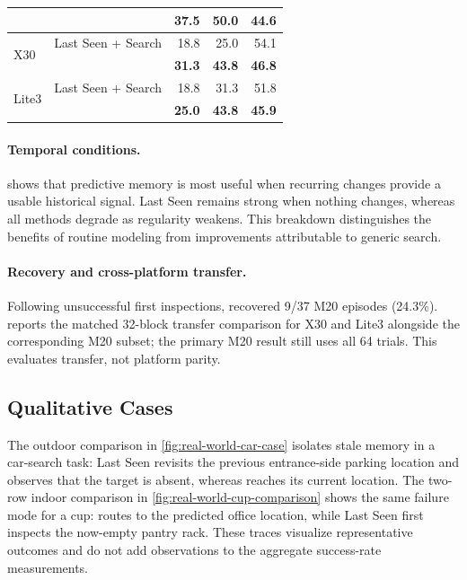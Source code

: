 \begin{table}[H]
\begin{minipage}[t]{0.49\linewidth}
{\begin{tabular}{@{}llrrr@{}}
& \textbf{\evolvingworldnav{}} & \textbf{37.5} & \textbf{50.0} & \textbf{44.6} \\
\midrule
\multirow{2}{*}{X30} & Last Seen + Search & 18.8 & 25.0 & 54.1 \\
& \textbf{\evolvingworldnav{}} & \textbf{31.3} & \textbf{43.8} & \textbf{46.8} \\
\midrule
\multirow{2}{*}{Lite3} & Last Seen + Search & 18.8 & 31.3 & 51.8 \\
& \textbf{\evolvingworldnav{}} & \textbf{25.0} & \textbf{43.8} & \textbf{45.9} \\
\bottomrule
\end{tabular}%
}
\end{minipage}
\end{table}

\paragraph{Temporal conditions.}
 shows that predictive memory is most useful when
recurring changes provide a usable historical signal. Last Seen remains strong
when nothing changes, whereas all methods degrade as regularity weakens. This
breakdown distinguishes the benefits of routine modeling from improvements
attributable to generic search.

\paragraph{Recovery and cross-platform transfer.}
Following unsuccessful first inspections, \evolvingworldnav{} recovered 9/37 M20
episodes (24.3\%).  reports the matched 32-block
transfer comparison for X30 and Lite3 alongside the corresponding M20 subset;
the primary M20 result still uses all 64 trials. This evaluates transfer, not
platform parity.

\subsection{Qualitative Cases}
\label{app:real-world-cases}

The outdoor comparison in \cref{fig:real-world-car-case} isolates stale memory
in a car-search task: Last Seen revisits the previous entrance-side parking
location and observes that the target is absent, whereas \evolvingworldnav{}
reaches its current location. The two-row indoor comparison in
\cref{fig:real-world-cup-comparison} shows the same failure mode for a cup:
\evolvingworldnav{} routes to the predicted office location, while Last Seen
first inspects the now-empty pantry rack. These traces visualize representative
outcomes and do not add observations to the aggregate success-rate measurements.

